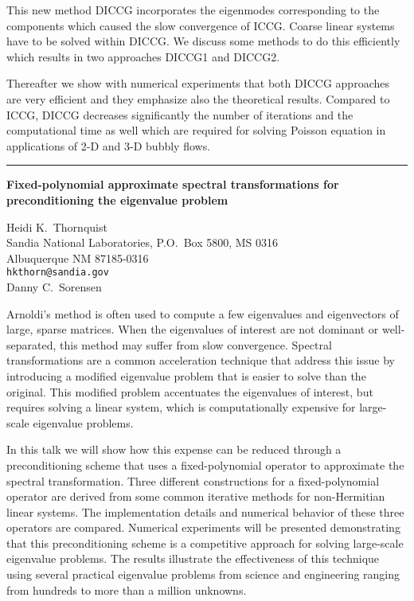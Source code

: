 \documentclass[twosided]{report}
\begin{document}
This new method DICCG incorporates the eigenmodes
corresponding to the components which caused the slow
convergence of ICCG. Coarse linear systems have to be solved
within DICCG. We discuss some methods to do this efficiently
which results in two approaches DICCG1 and DICCG2.

Thereafter we show with numerical experiments that both DICCG
approaches are very efficient and they emphasize also the
theoretical results. Compared to ICCG, DICCG decreases
significantly the number of iterations and the computational
time as well which are required for solving Poisson equation
in applications of 2-D and 3-D bubbly flows.



	\begin{center} \rule{6in}{1pt} \end{center}

\begin{center}
{\large			%
{\bf Fixed-polynomial approximate spectral transformations for \\
	preconditioning the eigenvalue problem}}

	Heidi K.~Thornquist \\
	Sandia National Laboratories, P.O.~Box 5800, MS 0316 \\
	Albuquerque NM 87185-0316 \\
	{\tt hkthorn@sandia.gov} \\
	Danny C.~Sorensen
\end{center}
Arnoldi's method is often used to compute a few eigenvalues
and eigenvectors of large, sparse matrices. When the
eigenvalues of interest are not dominant or well-separated,
this method may suffer from slow convergence. Spectral
transformations are a common acceleration technique that
address this issue by introducing a modified eigenvalue
problem that is easier to solve than the original. This
modified problem accentuates the eigenvalues of interest,
but requires solving a linear system, which is
computationally expensive for large-scale eigenvalue
problems.

In this talk we will show how this expense can
be reduced through a preconditioning scheme that uses a
fixed-polynomial operator to approximate the spectral
transformation. Three different constructions for a
fixed-polynomial operator are derived from some common
iterative methods for non-Hermitian linear systems. The
implementation details and numerical behavior of these three
operators are compared. Numerical experiments will be
presented demonstrating that this preconditioning scheme is
a competitive approach for solving large-scale eigenvalue
problems. The results illustrate the effectiveness of this
technique using several practical eigenvalue problems from
science and engineering ranging from hundreds to more than a
million unknowns.
\end{document}
